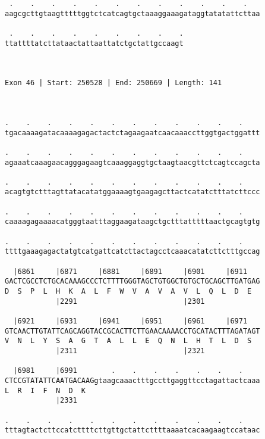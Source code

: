 \documentclass{article}
\begin{document}
\begin{Verbatim}
 .    .    .    .    .    .    .    .    .    .    .    .   
aagcgcttgtaagtttttggtctcatcagtgctaaaggaaagataggtatatattcttaa
                                                            
 .    .    .    .    .    .    .    .    .
ttattttatcttataactattaattatctgctattgccaagt
                                          
                                          
 
Exon 46 | Start: 250528 | End: 250669 | Length: 141



.    .    .    .    .    .    .    .    .    .    .    .    
tgacaaaagatacaaaagagactactctagaagaatcaacaaaccttggtgactggattt
                                                            
.    .    .    .    .    .    .    .    .    .    .    .    
agaaatcaaagaacagggagaagtcaaaggaggtgctaagtaacgttctcagtccagcta
                                                            
.    .    .    .    .    .    .    .    .    .    .    .    
acagtgtctttagttatacatatggaaaagtgaagagcttactcatatctttatcttccc
                                                            
.    .    .    .    .    .    .    .    .    .    .    .    
caaaagagaaaacatgggtaatttaggaagataagctgctttatttttaactgcagtgtg
                                                            
.    .    .    .    .    .    .    .    .    .    .    .    
ttttgaaagagactatgtcatgattcatcttactagcctcaaacatatcttctttgccag
                                                            
  |6861     |6871     |6881     |6891     |6901     |6911   
GACTCGCCTCTGCACAAAGCCCTCTTTTGGGTAGCTGTGGCTGTGCTGCAGCTTGATGAG
D  S  P  L  H  K  A  L  F  W  V  A  V  A  V  L  Q  L  D  E  
            |2291                         |2301             
  
  |6921     |6931     |6941     |6951     |6961     |6971   
GTCAACTTGTATTCAGCAGGTACCGCACTTCTTGAACAAAACCTGCATACTTTAGATAGT
V  N  L  Y  S  A  G  T  A  L  L  E  Q  N  L  H  T  L  D  S  
            |2311                         |2321             
  
  |6981     |6991        .    .    .    .    .    .    .    
CTCCGTATATTCAATGACAAGgtaagcaaactttgccttgaggttcctagattactcaaa
L  R  I  F  N  D  K                                         
            |2331                                           
  
.    .    .    .    .    .    .    .    .    .    .    .    
tttagtactcttccatcttttcttgttgctattcttttaaaatcacaagaagtccataac
                                                            

\end{Verbatim}
\end{document}
